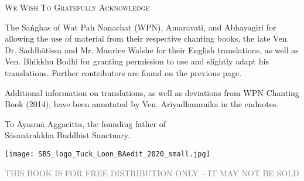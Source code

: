 \cleartorecto
\thispagestyle{empty}

{\setlength{\parskip}{10pt}

{\centering\fontsize{16}{25}\selectfont
\textsc{We Wish To Gratefully Acknowledge}
\par}

The Saṅghas of Wat Pah Nanachat (WPN), Amaravati, and Abhayagiri for allowing the use of material from their respective chanting books, the late Ven. Dr. Saddhātissa and Mr. Maurice Walshe for their English translations, as well as Ven. Bhikkhu Bodhi for granting permission to use and slightly adapt his translations. Further contributors are found on the previous page.


Additional information on translations, as well as deviations\hyperlink{endnote1-appendix}{\hypertarget{endnote1-body}{}}
from WPN Chanting Book (2014), have been annotated by Ven. Ariyadhammika in the endnotes.

\medskip

{\centering
To Āyasmā Aggacitta, the founding father of\\
Sāsanārakkha Buddhist Sanctuary.

\medskip

\texttt{[image: SBS\_logo\_Tuck\_Loon\_BAedit\_2020\_small.jpg]}

{\centering\fontsize{10}{30}\selectfont
  \textsc{\textcolor{gray}{THIS BOOK IS FOR FREE DISTRIBUTION ONLY – IT MAY NOT BE SOLD}}
\par}

}

}
